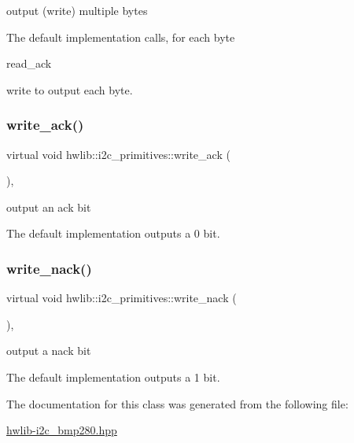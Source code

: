 output (write) multiple bytes

The default implementation calls, for each byte
\begin{DoxyItemize}
\item read\+\_\+ack
\item write to output each byte. 
\end{DoxyItemize}\mbox{\label{classhwlib_1_1i2c__primitives_a711df86e5129b7daeff7a622b7b734c6}} 
\subsubsection{\texorpdfstring{write\_ack()}{write\_ack()}}
{\footnotesize\ttfamily virtual void hwlib\+::i2c\+\_\+primitives\+::write\+\_\+ack (\begin{DoxyParamCaption}{ }\end{DoxyParamCaption})\hspace{0.3cm}{\ttfamily [inline]}, {\ttfamily [virtual]}}

output an ack bit

The default implementation outputs a 0 bit. \mbox{\label{classhwlib_1_1i2c__primitives_a5ca312553bc0817ffecf5f90caf96396}} 
\subsubsection{\texorpdfstring{write\_nack()}{write\_nack()}}
{\footnotesize\ttfamily virtual void hwlib\+::i2c\+\_\+primitives\+::write\+\_\+nack (\begin{DoxyParamCaption}{ }\end{DoxyParamCaption})\hspace{0.3cm}{\ttfamily [inline]}, {\ttfamily [virtual]}}

output a nack bit

The default implementation outputs a 1 bit. 

The documentation for this class was generated from the following file\+:\begin{DoxyCompactItemize}
\item 
\mbox{\hyperlink{hwlib-i2c__bmp280_8hpp}{hwlib-\/i2c\+\_\+bmp280.\+hpp}}\end{DoxyCompactItemize}
